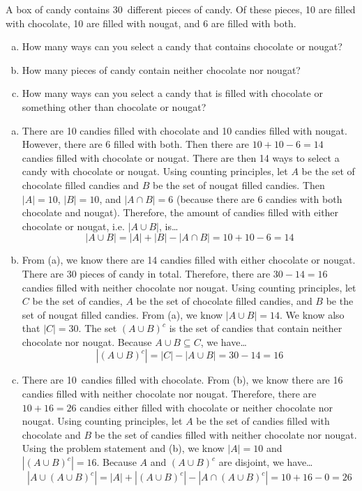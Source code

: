 \documentclass[11pt,letterpaper]{article}
\begin{document}

 A box of candy contains 30~different pieces of candy. Of these pieces, 10 are filled with chocolate, 10 are filled with nougat, and 6 are filled with both. 
	\begin{enumerate}[(a)]
	\item How many ways can you select a candy that contains chocolate or nougat?
	\item How many pieces of candy contain neither chocolate nor nougat?
	\item How many ways can you select a candy that is filled with chocolate or something other than chocolate or nougat?
	\end{enumerate} \pspace

\sol 
\begin{enumerate}[(a)]
\item There are 10 candies filled with chocolate and 10 candies filled with nougat. However, there are 6 filled with both. Then there are $10 + 10 - 6= 14$ candies filled with chocolate or nougat. There are then 14 ways to select a candy with chocolate or nougat. Using counting principles, let $A$ be the set of chocolate filled candies and $B$ be the set of nougat filled candies. Then $|A|= 10$, $|B|= 10$, and $|A \cap B|= 6$ (because there are 6 candies with both chocolate and nougat). Therefore, the amount of candies filled with either chocolate or nougat, i.e. $|A \cup B|$, is\dots
	\[
	|A \cup B|= |A| + |B| - |A \cap B|= 10 + 10 - 6= 14
	\] \pspace

\item From (a), we know there are 14 candies filled with either chocolate or nougat. There are 30 pieces of candy in total. Therefore, there are $30 - 14= 16$ candies filled with neither chocolate nor nougat. Using counting principles, let $C$ be the set of candies, $A$ be the set of chocolate filled candies, and $B$ be the set of nougat filled candies. From (a), we know $|A \cup B|= 14$. We know also that $|C|= 30$. The set $(A \cup B)^c$ is the set of candies that contain neither chocolate nor nougat. Because $A \cup B \subseteq C$, we have\dots
	\[
	|(A \cup B)^c|= |C| - |A \cup B|= 30 - 14= 16
	\] \pspace

\item There are 10~candies filled with chocolate. From (b), we know there are 16 candies filled with neither chocolate nor nougat. Therefore, there are $10 + 16= 26$ candies either filled with chocolate or neither chocolate nor nougat. Using counting principles, let $A$ be the set of candies filled with chocolate and $B$ be the set of candies filled with neither chocolate nor nougat. Using the problem statement and (b), we know $|A|= 10$ and $|(A \cup B)^c|= 16$. Because $A$ and $(A \cup B)^c$ are disjoint, we have\dots
	\[
	|A \cup (A \cup B)^c|= |A| + |(A \cup B)^c| - |A \cap (A \cup B)^c|= 10 + 16 - 0= 26
	\]
\end{enumerate}
\end{document}
